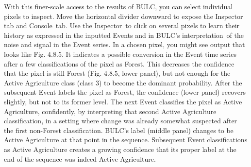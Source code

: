 \documentclass[
  letterpaper,
  DIV=11,
  numbers=noendperiod]{scrreprt}
\begin{document}
With this finer-scale access to the results of BULC, you can select
individual pixels to inspect. Move the horizontal divider downward to
expose the Inspector tab and Console~tab. Use the Inspector~to click on
several pixels to learn their history as expressed in the inputted
Events and in BULC's interpretation~of the noise and signal in the Event
series. In a chosen pixel, you might see output that looks like Fig.
4.8.5. It indicates a possible conversion in the Event time series after
a few classifications of the pixel as Forest. This decreases the
confidence that the pixel is still Forest (Fig. 4.8.5, lower panel), but
not enough for the Active Agriculture class (class 3) to become the
dominant probability. After the subsequent Event labels the pixel as
Forest, the confidence (lower panel) recovers slightly, but not to its
former level. The next Event classifies the pixel as Active Agriculture,
confidently, by interpreting that second Active Agriculture
classification, in a setting where change was already somewhat suspected
after the first non-Forest classification. BULC's label (middle panel)
changes to be Active Agriculture at that point in the sequence.
Subsequent Event classifications as Active Agriculture creates a growing
confidence that its proper label at the end of the sequence was indeed
Active Agriculture.
\end{document}
